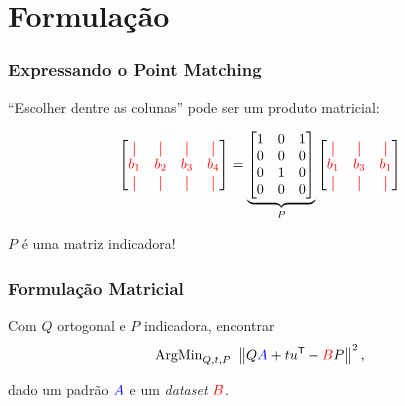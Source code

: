 \section{Formulação}

\begin{frame}[fragile]
  \frametitle{Expressando o Point Matching}
  \begin{center}
    ``Escolher dentre as colunas'' pode ser um produto matricial:

    \[
      \begin{bmatrix}
        \red{\vert} & \red{\vert} & \red{\vert} & \red{\vert} \\
        \red{b_1} & \red{b_2} & \red{b_3} & \red{b_4} \\
        \red{\vert} & \red{\vert} & \red{\vert} & \red{\vert}
      \end{bmatrix}
      =
      \underbrace{\begin{bmatrix}
        1 & 0 & 1 \\
        0 & 0 & 0 \\
        0 & 1 & 0 \\
        0 & 0 & 0
      \end{bmatrix}}_{P}
      \begin{bmatrix}
        \red{\vert} & \red{\vert} & \red{\vert} \\
        \red{b_1} & \red{b_3} & \red{b_1} \\
        \red{\vert} & \red{\vert} & \red{\vert}
      \end{bmatrix}
    \]

    $P$ é uma matriz indicadora!
  \end{center}
\end{frame}

\begin{frame}
  \frametitle{Formulação Matricial}
  \begin{center}
    Com $Q$ ortogonal e $P$ indicadora, encontrar
    \[\text{ArgMin}_{Q,t,P}\,\, \left\lVert Q\textcolor{blue}{A} + t u^{\mathsf{T}\mkern-1mu} - \textcolor{red}{B}P\right\rVert^2,\]

    dado um padrão $\textcolor{blue}{A}$ e um \textit{dataset} $\textcolor{red}{B}$.
  \end{center}
\end{frame}
